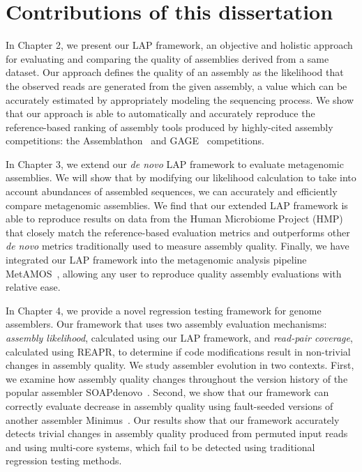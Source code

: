 \documentclass[12pt,\mydriver]{thesis}
\begin{document}
\section{Contributions of this dissertation}

In Chapter 2, we present our LAP framework, an objective and holistic approach for evaluating and
comparing the quality of assemblies derived from a same dataset.  Our
approach defines the quality of an assembly as the likelihood that the
observed reads are generated from the given assembly, a value which can
be accurately estimated by appropriately modeling the sequencing
process. We show that our approach is able to automatically and accurately reproduce the
reference-based ranking of assembly tools produced by highly-cited assembly competitions: the
Assemblathon~\cite{earl2011assemblathon} and GAGE~\cite{salzberg2011gage}
competitions.

In Chapter 3, we extend our \emph{de novo} LAP framework to evaluate metagenomic assemblies.
We will show that by modifying our likelihood calculation to take into account abundances of assembled sequences, we can accurately and efficiently compare metagenomic assemblies.
We find that our extended LAP framework is able to reproduce results on data from the Human Microbiome Project (HMP)~\cite{mitreva2012structure,methe2012framework} that closely match the reference-based evaluation metrics and outperforms other \emph{de novo} metrics traditionally used to measure assembly quality.
Finally, we have integrated our LAP framework into the metagenomic analysis pipeline MetAMOS~\cite{treangen2013metamos}, allowing any user to reproduce quality assembly evaluations with relative ease.

In Chapter 4, we provide a novel regression testing framework for genome assemblers.
Our framework that uses two assembly evaluation mechanisms: \emph{assembly likelihood}, calculated using our LAP framework\cite{LAP}, and \emph{read-pair coverage}, calculated using REAPR\cite{hunt2013reapr}, to determine if code modifications result in non-trivial
changes in assembly quality.
We study assembler evolution in two contexts. First,
we examine how assembly quality changes
throughout the version history of the popular assembler SOAPdenovo~\cite{luo2012soapdenovo2}. Second,
we show that our framework can correctly evaluate decrease in assembly quality
using fault-seeded versions of another assembler Minimus~\cite{sommer2007minimus}.
Our results show that our framework accurately detects trivial
changes in assembly quality produced from permuted input reads and using
multi-core systems, which fail to be detected using traditional regression
testing methods.
\end{document}
